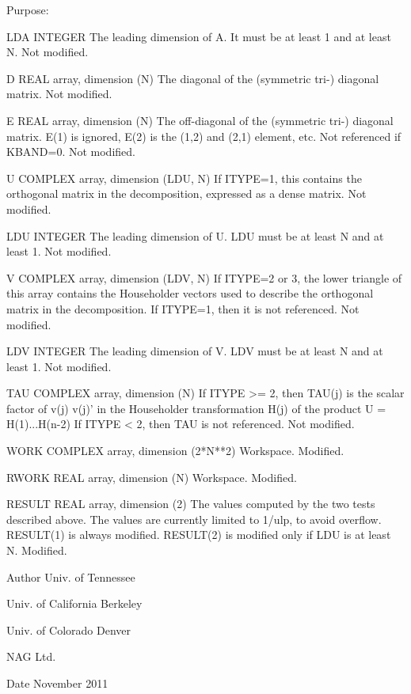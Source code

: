 \begin{DoxyParagraph}{Purpose\+: }
\begin{DoxyVerb}
  LDA     INTEGER
          The leading dimension of A.  It must be at least 1
          and at least N.
          Not modified.

  D       REAL array, dimension (N)
          The diagonal of the (symmetric tri-) diagonal matrix.
          Not modified.

  E       REAL array, dimension (N)
          The off-diagonal of the (symmetric tri-) diagonal matrix.
          E(1) is ignored, E(2) is the (1,2) and (2,1) element, etc.
          Not referenced if KBAND=0.
          Not modified.

  U       COMPLEX array, dimension (LDU, N)
          If ITYPE=1, this contains the orthogonal matrix in
          the decomposition, expressed as a dense matrix.
          Not modified.

  LDU     INTEGER
          The leading dimension of U.  LDU must be at least N and
          at least 1.
          Not modified.

  V       COMPLEX array, dimension (LDV, N)
          If ITYPE=2 or 3, the lower triangle of this array contains
          the Householder vectors used to describe the orthogonal
          matrix in the decomposition.  If ITYPE=1, then it is not
          referenced.
          Not modified.

  LDV     INTEGER
          The leading dimension of V.  LDV must be at least N and
          at least 1.
          Not modified.

  TAU     COMPLEX array, dimension (N)
          If ITYPE >= 2, then TAU(j) is the scalar factor of
          v(j) v(j)' in the Householder transformation H(j) of
          the product  U = H(1)...H(n-2)
          If ITYPE < 2, then TAU is not referenced.
          Not modified.

  WORK    COMPLEX array, dimension (2*N**2)
          Workspace.
          Modified.

  RWORK   REAL array, dimension (N)
          Workspace.
          Modified.

  RESULT  REAL array, dimension (2)
          The values computed by the two tests described above.  The
          values are currently limited to 1/ulp, to avoid overflow.
          RESULT(1) is always modified.  RESULT(2) is modified only
          if LDU is at least N.
          Modified.\end{DoxyVerb}
 
\end{DoxyParagraph}
\begin{DoxyAuthor}{Author}
Univ. of Tennessee 

Univ. of California Berkeley 

Univ. of Colorado Denver 

N\+A\+G Ltd. 
\end{DoxyAuthor}
\begin{DoxyDate}{Date}
November 2011 
\end{DoxyDate}
\hypertarget{group__complex__eig_gaf0279384c87f94223fdf27a4d97f4f7d}{}
